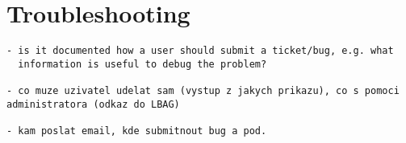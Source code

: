 \section{Troubleshooting}


\begin{verbatim}
- is it documented how a user should submit a ticket/bug, e.g. what
  information is useful to debug the problem?

- co muze uzivatel udelat sam (vystup z jakych prikazu), co s pomoci administratora (odkaz do LBAG)

- kam poslat email, kde submitnout bug a pod.
\end{verbatim}
